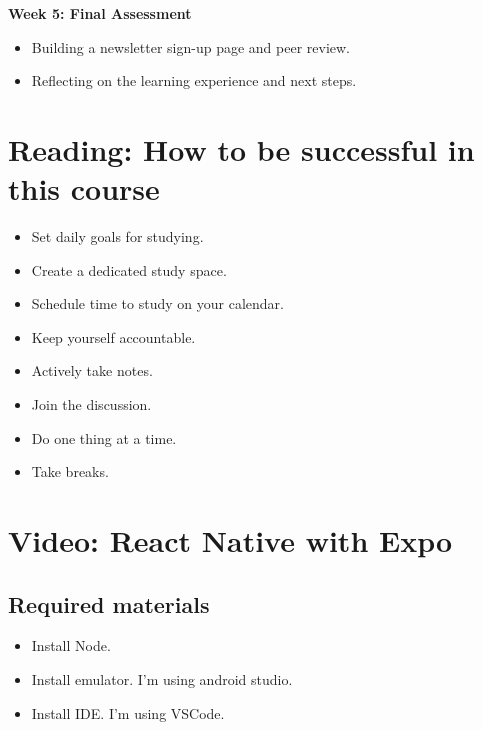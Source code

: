 \textbf{Week 5: Final Assessment}
\begin{itemize}
    \item Building a newsletter sign-up page and peer review.
    \item Reflecting on the learning experience and next steps.
\end{itemize}

\section{Reading: How to be successful in this course}
\begin{itemize}
    \item Set daily goals for studying.
    \item Create a dedicated study space.
    \item Schedule time to study on your calendar.
    \item Keep yourself accountable.
    \item Actively take notes.
    \item Join the discussion.
    \item Do one thing at a time.
    \item Take breaks.
\end{itemize}

\section{Video: React Native with Expo}
\subsection{Required materials}
\begin{itemize}
    \item Install Node.
    \item Install emulator. I'm using android studio.
    \item Install IDE. I'm using VSCode.
\end{itemize}

